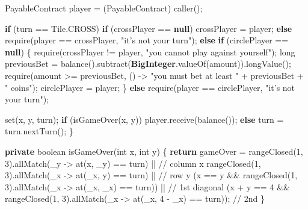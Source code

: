 \documentclass[a4paper,]{book}
\newenvironment{Shaded}{\begin{snugshade}}{\end{snugshade}}
\newcommand{\BuiltInTok}[1]{\textcolor[rgb]{0.39,0.29,0.61}{\textbf{#1}}}
\newcommand{\CommentTok}[1]{\textcolor[rgb]{0.54,0.53,0.53}{#1}}
\newcommand{\DataTypeTok}[1]{\textcolor[rgb]{0.00,0.34,0.68}{#1}}
\newcommand{\DecValTok}[1]{\textcolor[rgb]{0.69,0.50,0.00}{#1}}
\newcommand{\FunctionTok}[1]{\textcolor[rgb]{0.39,0.29,0.61}{#1}}
\newcommand{\KeywordTok}[1]{\textcolor[rgb]{0.12,0.11,0.11}{\textbf{#1}}}
\newcommand{\NormalTok}[1]{\textcolor[rgb]{0.12,0.11,0.11}{#1}}
\newcommand{\StringTok}[1]{\textcolor[rgb]{0.75,0.01,0.01}{#1}}
\renewenvironment{Shaded}{\begin{snugshade}\small}{\end{snugshade}}
\begin{document}
{\begin{Shaded}
\begin{Highlighting}[]
\NormalTok{    PayableContract player = (PayableContract) }\FunctionTok{caller}\NormalTok{();}

    \KeywordTok{if}\NormalTok{ (turn == Tile.}\FunctionTok{CROSS}\NormalTok{)}
      \KeywordTok{if}\NormalTok{ (crossPlayer == }\KeywordTok{null}\NormalTok{)}
\NormalTok{        crossPlayer = player;}
      \KeywordTok{else}
        \FunctionTok{require}\NormalTok{(player == crossPlayer, }\StringTok{"it's not your turn"}\NormalTok{);}
    \KeywordTok{else}
      \KeywordTok{if}\NormalTok{ (circlePlayer == }\KeywordTok{null}\NormalTok{) \{}
        \FunctionTok{require}\NormalTok{(crossPlayer != player, }\StringTok{"you cannot play against yourself"}\NormalTok{);}
        \DataTypeTok{long}\NormalTok{ previousBet = }\FunctionTok{balance}\NormalTok{().}\FunctionTok{subtract}\NormalTok{(}\BuiltInTok{BigInteger}\NormalTok{.}\FunctionTok{valueOf}\NormalTok{(amount)).}\FunctionTok{longValue}\NormalTok{();}
        \FunctionTok{require}\NormalTok{(amount >= previousBet,}
\NormalTok{          () -> }\StringTok{"you must bet at least "}\NormalTok{ + previousBet + }\StringTok{" coins"}\NormalTok{);}
\NormalTok{        circlePlayer = player;}
\NormalTok{      \}}
      \KeywordTok{else}
        \FunctionTok{require}\NormalTok{(player == circlePlayer, }\StringTok{"it's not your turn"}\NormalTok{);}

    \FunctionTok{set}\NormalTok{(x, y, turn);}
    \KeywordTok{if}\NormalTok{ (}\FunctionTok{isGameOver}\NormalTok{(x, y))}
\NormalTok{      player.}\FunctionTok{receive}\NormalTok{(}\FunctionTok{balance}\NormalTok{());}
    \KeywordTok{else}
\NormalTok{      turn = turn.}\FunctionTok{nextTurn}\NormalTok{();}
\NormalTok{  \}}

  \KeywordTok{private} \DataTypeTok{boolean} \FunctionTok{isGameOver}\NormalTok{(}\DataTypeTok{int}\NormalTok{ x, }\DataTypeTok{int}\NormalTok{ y) \{}
    \KeywordTok{return}\NormalTok{ gameOver =}
      \FunctionTok{rangeClosed}\NormalTok{(}\DecValTok{1}\NormalTok{, }\DecValTok{3}\NormalTok{).}\FunctionTok{allMatch}\NormalTok{(_y -> }\FunctionTok{at}\NormalTok{(x, _y) == turn) || }\CommentTok{// column x}
      \FunctionTok{rangeClosed}\NormalTok{(}\DecValTok{1}\NormalTok{, }\DecValTok{3}\NormalTok{).}\FunctionTok{allMatch}\NormalTok{(_x -> }\FunctionTok{at}\NormalTok{(_x, y) == turn) || }\CommentTok{// row y}
\NormalTok{      (x == y && }\FunctionTok{rangeClosed}\NormalTok{(}\DecValTok{1}\NormalTok{, }\DecValTok{3}\NormalTok{).}\FunctionTok{allMatch}\NormalTok{(_x -> }\FunctionTok{at}\NormalTok{(_x, _x) == turn)) || }\CommentTok{// 1st diagonal}
\NormalTok{      (x + y == }\DecValTok{4}\NormalTok{ && }\FunctionTok{rangeClosed}\NormalTok{(}\DecValTok{1}\NormalTok{, }\DecValTok{3}\NormalTok{).}\FunctionTok{allMatch}\NormalTok{(_x -> }\FunctionTok{at}\NormalTok{(_x, }\DecValTok{4}\NormalTok{ - _x) == turn)); }\CommentTok{// 2nd}
\NormalTok{  \}}


\end{Highlighting}
\end{Shaded}}
\end{document}

